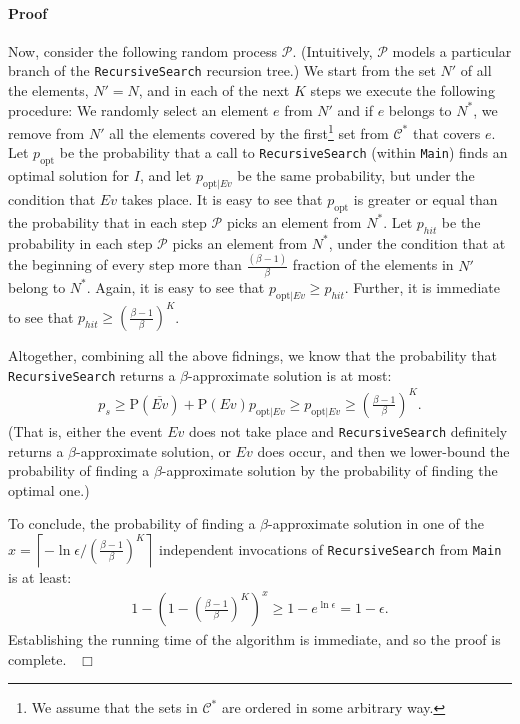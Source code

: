 \documentclass[11pt]{article}
\newcommand{\opt}{{{{\mathrm{opt}}}}}
\newcommand{\probability}{{{\mathrm{P}}}}
\newcommand{\Ev}{{\mathit{Ev}}}
\newcommand{\hit}{{\mathit{hit}}}
\newenvironment{proof}{\paragraph{Proof}}{\hfill$\Box$\medskip}
\newcommand{\calC}{{{\mathcal{C}}}}
\newcommand{\calP}{{{\mathcal{P}}}}
\begin{document}
\begin{proof}
  Now, consider the following random process $\calP$. (Intuitively,
  $\calP$ models a particular branch of the \texttt{RecursiveSearch}
  recursion tree.)  We start from the set $N'$ of all the elements,
  $N' = N$, and in each of the next $K$ steps we execute the following
  procedure: We randomly select an element $e$ from $N'$ and if $e$
  belongs to $N^*$, we remove from $N'$ all the elements covered by
  the first\footnote{We assume that the sets in $\calC^*$ are ordered
    in some arbitrary way.} set from $\calC^*$ that covers $e$. Let
  $p_\opt$ be the probability that a call to \texttt{RecursiveSearch}
  (within \texttt{Main}) finds an optimal solution for $I$, and let
  $p_{\opt|\Ev}$ be the same probability, but under the condition that
  $\Ev$ takes place.  It is easy to see that $p_\opt$ is greater or
  equal than the probability that in each step $\calP$ picks an
  element from $N^*$.  Let $p_\hit$ be the probability in each step
  $\calP$ picks an element from $N^*$, under the condition that at the
  beginning of every step more than $\frac{(\beta - 1)}{\beta}$
  fraction of the elements in $N'$ belong to $N^*$. Again, it is easy
  to see that $p_{\opt|\Ev} \geq p_\hit$. Further, it is immediate
  to see that $p_\hit \geq \left(\frac{\beta - 1}{\beta}\right)^K$.

  Altogether, combining all the above fidnings, we know that the
  probability that \texttt{Re\-cur\-sive\-Search} returns a $\beta$-approximate
  solution is at most:
  \begin{align*}
    p_{s} \geq \probability(\overline{\Ev}) + \probability(\Ev)p_{\opt|\Ev}
    \geq p_{\opt|\Ev} \geq \left(\frac{\beta - 1}{\beta}\right)^K
    \textrm{.}
  \end{align*}
  (That is, either the event $\Ev$ does not take place and
  \texttt{RecursiveSearch} definitely returns a $\beta$-approximate
  solution, or $\Ev$ does occur, and then we lower-bound the
  probability of finding a $\beta$-approximate solution by the
  probability of finding the optimal one.)

  To conclude, the probability of finding a $\beta$-approximate
  solution in one of the $x = \left\lceil -\ln
    \epsilon/\left(\frac{\beta - 1}{\beta}\right)^K \right\rceil$
  independent invocations of \texttt{RecursiveSearch} from
  \texttt{Main} is at least:
  \begin{align*}
    1 - \left(1 - \left(\frac{\beta - 1}{\beta}\right)^K\right)^x \geq
    1 - e^{\ln\epsilon} = 1 - \epsilon \textrm{.}
  \end{align*}
  Establishing the running time of the algorithm is immediate, and so
  the proof is complete.~
\end{proof}
\end{document}
